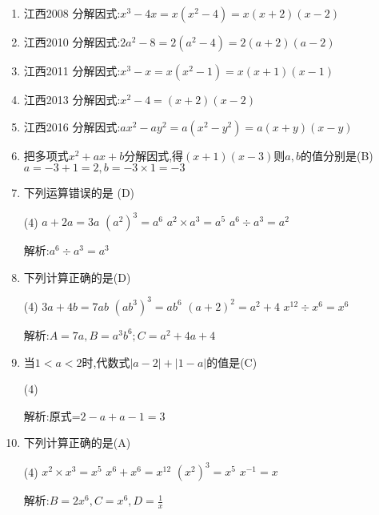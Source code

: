 \documentclass[cn,blue]{elegantbook}
\begin{document}
\begin{solution}
    \begin{enumerate}
        \item 江西2008 分解因式:\(x^3-4x=x(x^2-4)=x(x+2)(x-2)\)
        \item 江西2010 分解因式:\(2a^2-8=2(a^2-4)=2(a+2)(a-2)\)
        \item 江西2011 分解因式:\(x^3-x=x(x^2-1)=x(x+1)(x-1)\)
        \item 江西2013 分解因式:\(x^2-4=(x+2)(x-2)\)
        \item 江西2016 分解因式:\(ax^2-ay^2=a(x^2-y^2)=a(x+y)(x-y)\)
        \item 把多项式\(x^2+ax+b\)分解因式,得\((x+1)(x-3)\)则\(a,b\)的值分别是(B)\\
            \(a=-3+1=2,b=-3\times 1=-3\)
        \item 下列运算错误的是 (D)\\
            \begin{tasks}(4) 
                \task \(a+2a=3a\)
                \task \((a^2)^3=a^6\)
                \task \(a^2 \times a^3=a^5\)
                \task \(a^6 \div a^3=a^2\)
            \end{tasks}
            解析:\(a^6\div a^3=a^3\)
        \item 下列计算正确的是(D)\\
            \begin{tasks}(4) 
                \task \(3a+4b=7ab\)
                \task \((ab^3)^3=ab^6\)
                \task \((a+2)^2=a^2+4\)
                \task \(x^{12} \div x^6=x^6\)
            \end{tasks}
            解析:\(A=7a, B=a^3b^6; C=a^2+4a+4\)
        \item 当\(1<a<2\)时,代数式\(|a-2|+|1-a|\)的值是(C)\\
            \begin{tasks}(4) 
            \end{tasks}
            解析:原式=\(2-a+a-1=3\)
        \item 下列计算正确的是(A)\\
            \begin{tasks}(4) 
            \task \(x^2 \times x^3=x^5\)
                \task \(x^6+x^6=x^{12}\)
                \task \((x^2)^3=x^5\)
                \task \(x^{-1}=x\)
            \end{tasks}
            解析:\(B=2x^6, C=x^6, D=\frac{1}{x}\)

\end{enumerate}
\end{solution}
\end{document}
